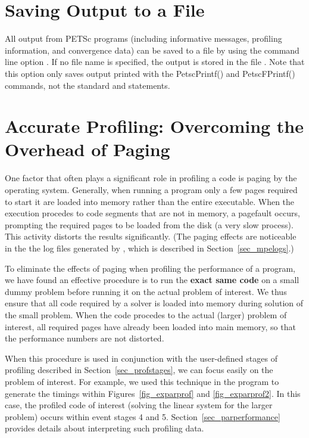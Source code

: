 {{%
\section{Saving Output to a File}

All output from PETSc programs (including informative messages, profiling information,
and convergence data) can be saved to a file by using the command line
option . 
If no file name is specified, the output is stored in the file .
 Note that this option only saves output printed with 
the PetscPrintf() and PetscFPrintf() commands, not the
standard  and  statements. 
 

\section{Accurate Profiling: Overcoming the Overhead of Paging}
\label{sec_profaccuracy}

One factor that often plays a significant role in profiling a code is
paging by the operating system.  Generally, when running a program
only a few pages required to start it are loaded into memory rather
than the entire executable.  When the execution procedes to code
segments that are not in memory, a pagefault occurs, prompting the
required pages to be loaded from the disk (a very slow process).  This
activity distorts the results significantly. (The paging effects are
noticeable in the the log files generated by , which is
described in Section~\ref{sec_mpelogs}.)

To eliminate the effects of paging when profiling the performance of a
program, we have found an effective procedure is to run the {\bf exact same
code} on a small dummy problem before running it on the actual problem
of interest. We thus ensure that all code required by a solver is
loaded into memory during solution of the small problem.  When the
code procedes to the actual (larger) problem of interest, all required
pages have already been loaded into main memory, so that the
performance numbers are not distorted.

When this procedure is used in conjunction with the user-defined stages of profiling
described in Section~\ref{sec_profstages}, we can focus easily on the
problem of interest.  For example, we used this technique in the program
 to
generate the timings within Figures~\ref{fig_exparprof} and \ref{fig_exparprof2}.
In this case,
the profiled code of interest (solving the linear system for the larger problem)
occurs within event stages 4 and 5.  Section~\ref{sec_parperformance} provides
details about interpreting such profiling data.

}}
